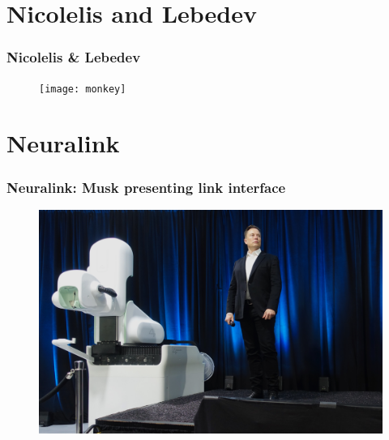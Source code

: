 \documentclass[12pt, aspectratio=169]{beamer}
\begin{document}
\section{Nicolelis and Lebedev}
\begin{frame}
  \frametitle{Nicolelis \& Lebedev}
  \begin{figure}
    \texttt{[image: monkey]}
  \end{figure}
\end{frame}



\section{Neuralink}

\begin{frame}
  \frametitle{Neuralink: Musk presenting link interface}
  \begin{figure}
    \includegraphics[width=0.6\linewidth]{Elon_Musk_and_the_Neuralink_Future}
  \end{figure}
\end{frame}

\end{document}

